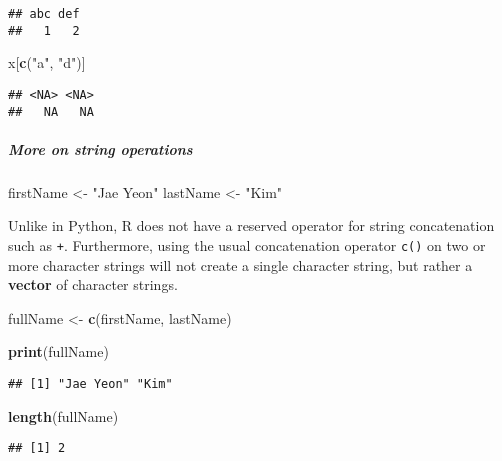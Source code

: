 \documentclass[
]{book}
\newenvironment{Shaded}{\begin{snugshade}}{\end{snugshade}}
\newcommand{\KeywordTok}[1]{\textcolor[rgb]{0.13,0.29,0.53}{\textbf{#1}}}
\newcommand{\NormalTok}[1]{#1}
\newcommand{\StringTok}[1]{\textcolor[rgb]{0.31,0.60,0.02}{#1}}
\begin{document}
\begin{verbatim}
## abc def 
##   1   2
\end{verbatim}

\begin{Shaded}
\begin{Highlighting}[]
\NormalTok{x[}\KeywordTok{c}\NormalTok{(}\StringTok{"a"}\NormalTok{, }\StringTok{"d"}\NormalTok{)]}
\end{Highlighting}
\end{Shaded}

\begin{verbatim}
## <NA> <NA> 
##   NA   NA
\end{verbatim}

\hypertarget{more-on-string-operations}{%
\subparagraph{More on string operations}\label{more-on-string-operations}}

\begin{Shaded}
\begin{Highlighting}[]
\NormalTok{firstName \textless{}{-}}\StringTok{ "Jae Yeon"}
\NormalTok{lastName \textless{}{-}}\StringTok{ "Kim"}
\end{Highlighting}
\end{Shaded}

Unlike in Python, R does not have a reserved operator for string concatenation such as \texttt{+}. Furthermore, using the usual concatenation operator \texttt{c()} on two or more character strings will not create a single character string, but rather a \textbf{vector} of character strings.

\begin{Shaded}
\begin{Highlighting}[]
\NormalTok{fullName \textless{}{-}}\StringTok{ }\KeywordTok{c}\NormalTok{(firstName, lastName)}

\KeywordTok{print}\NormalTok{(fullName)}
\end{Highlighting}
\end{Shaded}

\begin{verbatim}
## [1] "Jae Yeon" "Kim"
\end{verbatim}

\begin{Shaded}
\begin{Highlighting}[]
\KeywordTok{length}\NormalTok{(fullName)}
\end{Highlighting}
\end{Shaded}

\begin{verbatim}
## [1] 2
\end{verbatim}
\end{document}
